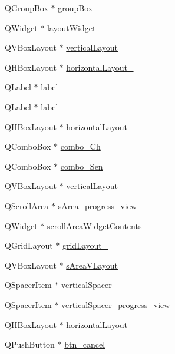 \begin{DoxyCompactItemize}
\item 
Q\+Group\+Box $\ast$ \hyperlink{a00027_a320d3d7ba1cb8fff7b7b95923ed10f5e}{group\+Box\+\_}
\item 
Q\+Widget $\ast$ \hyperlink{a00027_ab96ab0f0578098521fa69a75aa5cdde8}{layout\+Widget}
\item 
Q\+V\+Box\+Layout $\ast$ \hyperlink{a00027_aecd96a04789fcfec3f98d80390ad8184}{vertical\+Layout}
\item 
Q\+H\+Box\+Layout $\ast$ \hyperlink{a00027_a80867018070156432923d0266cc9fe25}{horizontal\+Layout\+\_}
\item 
Q\+Label $\ast$ \hyperlink{a00027_ad9c89133780f28e6efa2ec17ceb9cff5}{label}
\item 
Q\+Label $\ast$ \hyperlink{a00027_a2e2516d755e4dd53fc905dabddf2738a}{label\+\_}
\item 
Q\+H\+Box\+Layout $\ast$ \hyperlink{a00027_acd6fdc9ebacc4b25b834162380d75ce8}{horizontal\+Layout}
\item 
Q\+Combo\+Box $\ast$ \hyperlink{a00027_a263fb43f2eff37a44ff7359ba41e2eeb}{combo\+\_\+\+Ch}
\item 
Q\+Combo\+Box $\ast$ \hyperlink{a00027_ad95005b5fcac8126171019298147b285}{combo\+\_\+\+Sen}
\item 
Q\+V\+Box\+Layout $\ast$ \hyperlink{a00027_afcc20a3d5058037a00cdc6122f231848}{vertical\+Layout\+\_}
\item 
Q\+Scroll\+Area $\ast$ \hyperlink{a00027_ae4fe44aa026dd0e84e0f10cdcabca504}{s\+Area\+\_\+progress\+\_\+view}
\item 
Q\+Widget $\ast$ \hyperlink{a00027_aa70fc2af9f9ea3b686db12823c5deb47}{scroll\+Area\+Widget\+Contents}
\item 
Q\+Grid\+Layout $\ast$ \hyperlink{a00027_af42ea7d4c2e893181caad21e28166932}{grid\+Layout\+\_}
\item 
Q\+V\+Box\+Layout $\ast$ \hyperlink{a00027_a2bdce9ad313cd4ee575613f36cbc4678}{s\+Area\+V\+Layout}
\item 
Q\+Spacer\+Item $\ast$ \hyperlink{a00027_a8384329c3663ff274e926a12024aab52}{vertical\+Spacer}
\item 
Q\+Spacer\+Item $\ast$ \hyperlink{a00027_a1c7dd277b3eb0ab06b980e95e1b0be29}{vertical\+Spacer\+\_\+progress\+\_\+view}
\item 
Q\+H\+Box\+Layout $\ast$ \hyperlink{a00027_a17c8bb967f8ecc58406ac7ca1bec7b7e}{horizontal\+Layout\+\_}
\item 
Q\+Push\+Button $\ast$ \hyperlink{a00027_a26ea4040157d183322b8c1e5d7a55c9f}{btn\+\_\+cancel}
\item 

\end{DoxyCompactItemize}
